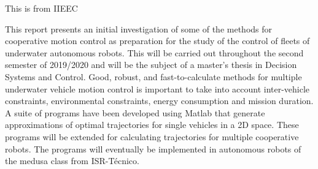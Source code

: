 
\par This is from IIEEC
\par 
This report presents an initial investigation of some of the methods for cooperative motion control as preparation for the study of the control of fleets of underwater autonomous robots. This will be carried out throughout the second semester of 2019/2020 and will be the subject of a master's thesis in Decision Systems and Control. Good, robust, and fast-to-calculate methods for multiple underwater vehicle motion control is important to take into account inter-vehicle constraints, environmental constraints, energy consumption and mission duration.  A suite of programs have been developed using Matlab that generate approximations of optimal trajectories for single vehicles in a 2D space. These programs will be extended for calculating trajectories for multiple cooperative robots. The programs will eventually be implemented in autonomous robots of the medusa class from ISR-Técnico.

